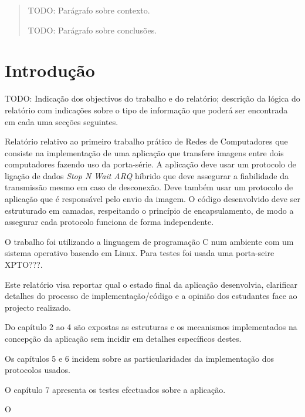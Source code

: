\documentclass[11pt,a4paper,reqno]{report}
\numberwithin{equation}{section}
\begin{document}



\begin{abstract}
	
TODO: Parágrafo sobre contexto.

TODO: Parágrafo sobre conclusões.

\end{abstract}

\tableofcontents


\chapter{Introdução}

TODO: Indicação dos objectivos do trabalho e do relatório; descrição da lógica do relatório com indicações sobre o tipo de informação que poderá ser encontrada em cada uma secções seguintes.

Relatório relativo ao primeiro trabalho prático de Redes de Computadores que consiste na implementação de uma aplicação que transfere imagens entre dois computadores fazendo uso da porta-série. A aplicação deve usar um protocolo de ligação de dados {\it Stop N Wait ARQ}  híbrido que deve assegurar a fiabilidade  da transmissão mesmo em caso de desconexão. Deve também usar um protocolo de aplicação que é responsável pelo envio da imagem. O código desenvolvido deve ser estruturado em camadas, respeitando o princípio de encapsulamento, de modo a assegurar cada protocolo funciona de forma independente.
	
	O trabalho foi utilizando a linguagem de programação C num ambiente com um sistema operativo baseado em Linux. Para testes foi usada uma porta-seire XPTO???.
	
	Este relatório visa reportar qual o estado final da aplicação desenvolvia, clarificar detalhes do processo de implementação/código e a opinião dos estudantes face ao projecto realizado.
	
	Do capítulo 2 ao 4 são expostas as estruturas e os mecanismos implementados na concepção da aplicação sem incidir em detalhes específicos destes.
	
	Os capítulos 5 e 6 incidem sobre as particularidades da implementação dos protocolos usados.
	
	O capítulo 7 apresenta os testes efectuados sobre a aplicação.
	
	O 
	
	
\end{document}
